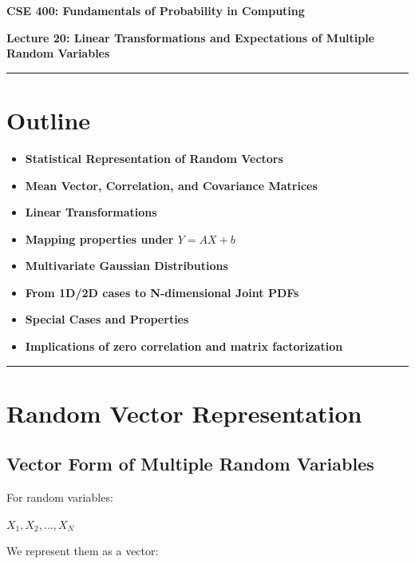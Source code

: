 \documentclass[12pt]{article}
\begin{document}
\begin{center}

{\fontsize{16}{18}\selectfont\textbf{CSE 400: Fundamentals of Probability in Computing}}

\vspace{10pt}

{\fontsize{14}{15}\selectfont\textbf{Lecture 20: Linear Transformations and Expectations of Multiple Random Variables}}

\vspace{8pt}
\end{center}

\hrule
\vspace{0.5cm}

\section{Outline}

\begin{itemize}
\item \textbf{Statistical Representation of Random Vectors}
\item \textbf{Mean Vector, Correlation, and Covariance Matrices}
\item \textbf{Linear Transformations}
\item \textbf{Mapping properties under $Y = AX + b$}
\item \textbf{Multivariate Gaussian Distributions}
\item \textbf{From 1D/2D cases to N-dimensional Joint PDFs}
\item \textbf{Special Cases and Properties}
\item \textbf{Implications of zero correlation and matrix factorization}
\end{itemize}

\hrule
\vspace{0.5cm}

\section{Random Vector Representation}

\subsection{Vector Form of Multiple Random Variables}

For random variables:

$X_1, X_2, ..., X_N$

We represent them as a vector:
\end{document}
